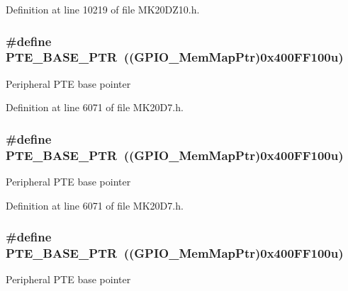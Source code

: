 Definition at line 10219 of file M\+K20\+D\+Z10.\+h.

\subsubsection[{\texorpdfstring{P\+T\+E\+\_\+\+B\+A\+S\+E\+\_\+\+P\+TR}{PTE_BASE_PTR}}]{\setlength{\rightskip}{0pt plus 5cm}\#define P\+T\+E\+\_\+\+B\+A\+S\+E\+\_\+\+P\+TR~(({\bf G\+P\+I\+O\+\_\+\+Mem\+Map\+Ptr})0x400\+F\+F100u)}\hypertarget{group___g_p_i_o___peripheral_gaa230685f72ad1540850ab8d12366775c}{}\label{group___g_p_i_o___peripheral_gaa230685f72ad1540850ab8d12366775c}
Peripheral P\+TE base pointer 

Definition at line 6071 of file M\+K20\+D7.\+h.

\subsubsection[{\texorpdfstring{P\+T\+E\+\_\+\+B\+A\+S\+E\+\_\+\+P\+TR}{PTE_BASE_PTR}}]{\setlength{\rightskip}{0pt plus 5cm}\#define P\+T\+E\+\_\+\+B\+A\+S\+E\+\_\+\+P\+TR~(({\bf G\+P\+I\+O\+\_\+\+Mem\+Map\+Ptr})0x400\+F\+F100u)}\hypertarget{group___g_p_i_o___peripheral_gaa230685f72ad1540850ab8d12366775c}{}\label{group___g_p_i_o___peripheral_gaa230685f72ad1540850ab8d12366775c}
Peripheral P\+TE base pointer 

Definition at line 6071 of file M\+K20\+D7.\+h.

\subsubsection[{\texorpdfstring{P\+T\+E\+\_\+\+B\+A\+S\+E\+\_\+\+P\+TR}{PTE_BASE_PTR}}]{\setlength{\rightskip}{0pt plus 5cm}\#define P\+T\+E\+\_\+\+B\+A\+S\+E\+\_\+\+P\+TR~(({\bf G\+P\+I\+O\+\_\+\+Mem\+Map\+Ptr})0x400\+F\+F100u)}\hypertarget{group___g_p_i_o___peripheral_gaa230685f72ad1540850ab8d12366775c}{}\label{group___g_p_i_o___peripheral_gaa230685f72ad1540850ab8d12366775c}
Peripheral P\+TE base pointer 

